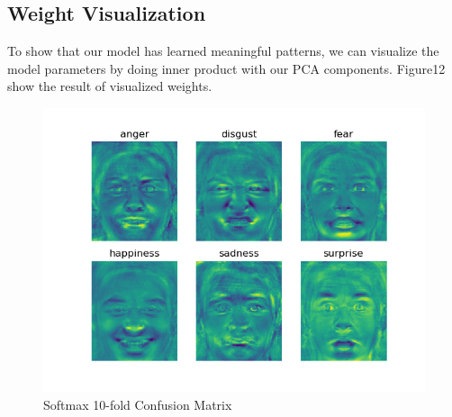 \documentclass{article} %
\begin{document}
\subsection {Weight Visualization}
To show that our model has learned meaningful patterns, we can visualize the model parameters by doing inner product with our PCA components. Figure12 show the result of visualized weights.
\begin{figure}[h]
	\centering
	\includegraphics[scale=0.5]{./graph/softmax_weight.png}
	\caption{Softmax 10-fold Confusion Matrix}
\end{figure}
\end{document}
